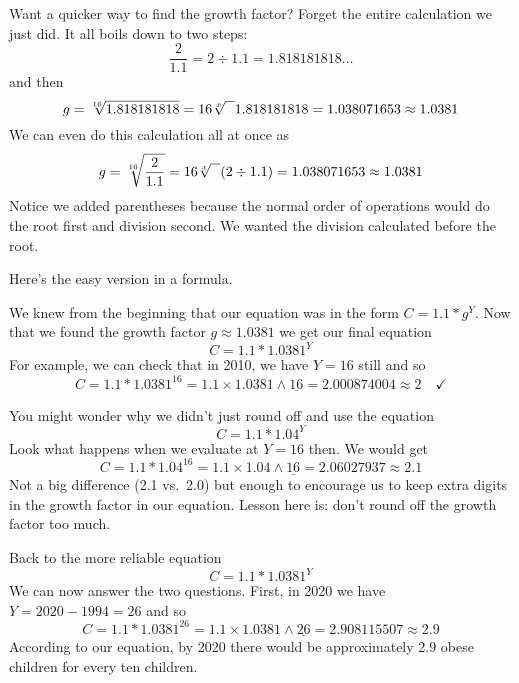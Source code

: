 Want a quicker way to find the growth factor?  Forget the entire calculation we just did.  
It all boils down to two steps: $$\frac{2}{1.1} = 2 \div 1.1 = 1.818181818\ldots$$
and then $$g =  \sqrt[16]{1.818181818} = 16 \sqrt[x]{\text{\raisebox{.6em}{~\text{  }}}} 1.818181818 = 1.038071653 \approx 1.0381$$
We can even do this calculation all at once as
 $$g =  \sqrt[16]{\frac{2}{1.1}} = 16 \sqrt[x]{\text{\raisebox{.6em}{~\text{  }}}} (2 \div 1.1)= 1.038071653 \approx 1.0381$$
Notice we added parentheses because the normal order of operations would do the root first and division second.  We wanted the division calculated before the root.  

Here's the easy version in a formula.

 \bigskip
  \bigskip

We knew from the beginning that our equation was in the form
$C = 1.1 \ast g^Y$.  Now that we found the growth factor $g \approx 1.0381$ we get our final equation $$C = 1.1 \ast 1.0381^Y$$
For example, we can check that in 2010, we have $Y=16$ still and so 
$$C = 1.1 \ast 1.0381^{16} = 1.1 \times 1.0381 \wedge \underline{16} =  2.000874004 \approx 2 \quad \checkmark$$ 

You might wonder why we didn't just round off and use the equation $$C = 1.1 \ast 1.04^Y$$ 
Look what happens when we evaluate at $Y=16$ then.  We would get
$$C = 1.1 \ast1.04^{16} = 1.1 \times 1.04 \wedge \underline{16} = 2.06027937 \approx 2.1$$
Not a big difference (2.1 vs.\ 2.0) but enough to encourage us to keep extra digits in the growth factor in our equation.  Lesson here is:  don't round off the growth factor too much.

Back to the more reliable equation $$C = 1.1 \ast 1.0381^Y$$
We can now answer the two questions. First, in 2020 we have $Y = 2020-1994 = 26$ and so $$C = 1.1 \ast 1.0381^{26} = 1.1 \times 1.0381 \wedge \underline{26} = 2.908115507 \approx 2.9$$
According to our equation, by 2020 there would be approximately 2.9 obese children for every ten children.


